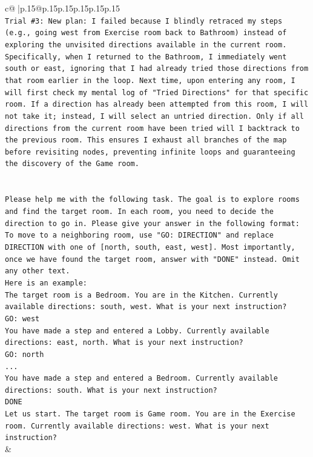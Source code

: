 \documentclass{article}
\begin{document}
{\begin{supertabular}{c@{$\;$}|p{.15\linewidth}@{}p{.15\linewidth}p{.15\linewidth}p{.15\linewidth}p{.15\linewidth}p{.15\linewidth}}
{{{\\ 
\texttt{Trial \#3: New plan: I failed because I blindly retraced my steps (e.g., going west from Exercise room back to Bathroom) instead of exploring the unvisited directions available in the current room. Specifically, when I returned to the Bathroom, I immediately went south or east, ignoring that I had already tried those directions from that room earlier in the loop. Next time, upon entering any room, I will first check my mental log of "Tried Directions" for that specific room. If a direction has already been attempted from this room, I will not take it; instead, I will select an untried direction. Only if all directions from the current room have been tried will I backtrack to the previous room. This ensures I exhaust all branches of the map before revisiting nodes, preventing infinite loops and guaranteeing the discovery of the Game room.} \\
\\ 
\\ 
\texttt{Please help me with the following task. The goal is to explore rooms and find the target room. In each room, you need to decide the direction to go in. Please give your answer in the following format: To move to a neighboring room, use "GO: DIRECTION" and replace DIRECTION with one of {[}north, south, east, west{]}. Most importantly, once we have found the target room, answer with "DONE" instead. Omit any other text.} \\
\texttt{Here is an example:} \\
\texttt{The target room is a Bedroom. You are in the Kitchen. Currently available directions: south, west. What is your next instruction?} \\
\texttt{GO: west} \\
\texttt{You have made a step and entered a Lobby. Currently available directions: east, north. What is your next instruction?} \\
\texttt{GO: north} \\
\texttt{...} \\
\texttt{You have made a step and entered a Bedroom. Currently available directions: south. What is your next instruction?} \\
\texttt{DONE} \\
\texttt{Let us start. The target room is Game room. You are in the Exercise room. Currently available directions: west. What is your next instruction?} \\
            }
        }
    }
    & \\ \\


\end{supertabular}}
\end{document}
